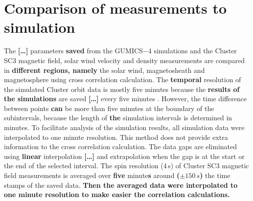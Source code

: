 \documentclass[linenumbers,draft]{agujournal}
\begin{document}
\section{Comparison of measurements to simulation}
\label{sec:comp}

The \textbf{[\dots]} parameters \textbf{saved} from the GUMICS$-$4 simulations and the Cluster SC3 magnetic field, solar wind velocity and density measurements are compared in \textbf{different regions, namely} the solar wind, magnetosheath and magnetosphere using cross correlation calculation. The \textbf{temporal} resolution of the simulated Cluster orbit data is mostly five minutes because the \textbf{results of the simulations} are saved \textbf{[\dots]} every five minutes \citep{facsko16:_one_earth}. However, the time difference between points \textbf{can} be more than five minutes at the boundary of the subintervals, because the length of \textbf{the} simulation intervals is determined in minutes. To facilitate analysis of the simulation results, all simulation data were interpolated to one minute resolution. This method does not provide extra information to the cross correlation calculation. The data gaps are eliminated using \textbf{linear} interpolation \textbf{[\dots]} and extrapolation when the gap is at the start or the end of the selected interval. The spin resolution (4\,s) of Cluster SC3 magnetic field measurements is averaged over \textbf{five} minute\textbf{s} around \textbf{($\pm150\,s$)} the time stamps of the saved data. \textbf{Then the averaged data were interpolated to one minute resolution to make easier the correlation calculations.}
\end{document}
